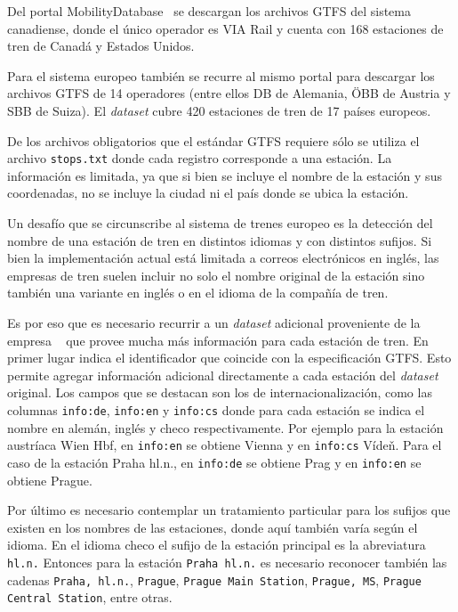Del portal MobilityDatabase~\cite{mobilitydatabase} se descargan los archivos GTFS del sistema
canadiense, donde el único operador es VIA Rail y cuenta con 168 estaciones de tren de Canadá y Estados Unidos.

Para el sistema europeo también se recurre al mismo portal para descargar los archivos GTFS de 14 operadores
(entre ellos DB de Alemania, ÖBB de Austria y SBB de Suiza).
El \textit{dataset} cubre 420 estaciones de tren de 17 países europeos.

De los archivos obligatorios que el estándar GTFS requiere sólo se utiliza el archivo \texttt{stops.txt} donde cada
registro corresponde a una estación.
La información es limitada, ya que si bien se incluye el nombre de la estación y sus coordenadas, no se incluye la
ciudad ni el país donde se ubica la estación.

Un desafío que se circunscribe al sistema de trenes europeo es la detección del nombre de una estación de tren en
distintos idiomas y con distintos sufijos.
Si bien la implementación actual está limitada a correos electrónicos en inglés, las empresas de tren suelen incluir
no solo el nombre original de la estación sino también una variante en inglés o en el idioma de la compañía de tren.

Es por eso que es necesario recurrir a un \textit{dataset} adicional proveniente de la empresa
~\cite{trainlineeu} que provee mucha más información para cada estación de tren.
En primer lugar indica el identificador que coincide con la especificación GTFS\@.
Esto permite agregar información adicional directamente a cada estación del \textit{dataset} original.
Los campos que se destacan son los de internacionalización, como las columnas \texttt{info:de}, \texttt{info:en} y
\texttt{info:cs} donde para cada estación se indica el nombre en alemán, inglés y checo respectivamente.
Por ejemplo para la estación austríaca Wien Hbf, en \texttt{info:en} se obtiene Vienna y en \texttt{info:cs} Vídeň.
Para el caso de la estación Praha hl.n., en \texttt{info:de} se obtiene Prag y en \texttt{info:en} se obtiene Prague.

Por último es necesario contemplar un tratamiento particular para los sufijos que existen en los nombres de las
estaciones, donde aquí también varía según el idioma.
En el idioma checo el sufijo de la estación principal es la abreviatura \texttt{hl.n.}
Entonces para la estación \texttt{Praha hl.n.} es necesario reconocer también las cadenas \texttt{Praha, hl.n.},
\texttt{Prague}, \texttt{Prague Main Station}, \texttt{Prague, MS}, \texttt{Prague Central Station}, entre otras.

